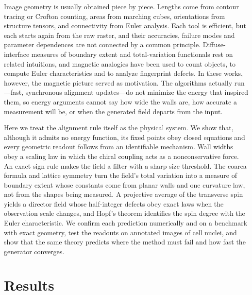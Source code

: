 \documentclass[11pt,a4paper]{article}
\begin{document}
Image geometry is usually obtained piece by piece. Lengths come from contour tracing or Crofton counting, areas from marching cubes\cite{Lorensen1987}, orientations from structure tensors\cite{Bigun1991,DiZenzo1986}, and connectivity from Euler analysis. Each tool is efficient, but each starts again from the raw raster, and their accuracies, failure modes and parameter dependences are not connected by a common principle. Diffuse-interface measures of boundary extent\cite{Modica1987,Allen1979,Chan2001} and total-variation functionals\cite{Rudin1992} rest on related intuitions, and magnetic analogies have been used to count objects\cite{Park2024AMT}, to compute Euler characteristics\cite{Moon2025SR} and to analyze fingerprint defects\cite{Park2025iScience}. In these works, however, the magnetic picture served as motivation. The algorithms actually run---fast, synchronous alignment updates---do not minimize the energy that inspired them, so energy arguments cannot say how wide the walls are, how accurate a measurement will be, or when the generated field departs from the input.

Here we treat the alignment rule itself as the physical system. We show that, although it admits no energy function, its fixed points obey closed equations and every geometric readout follows from an identifiable mechanism. Wall widths obey a scaling law in which the chiral coupling acts as a nonconservative force. An exact sign rule makes the field a filter with a sharp size threshold. The coarea formula and lattice symmetry turn the field's total variation into a measure of boundary extent whose constants come from planar walls and one curvature law, not from the shapes being measured. A projective average of the transverse spin yields a director field whose half-integer defects obey exact laws when the observation scale changes, and Hopf's theorem identifies the spin degree with the Euler characteristic. We confirm each prediction numerically and on a benchmark with exact geometry, test the readouts on annotated images of cell nuclei, and show that the same theory predicts where the method must fail and how fast the generator converges.

\section*{Results}
\end{document}
